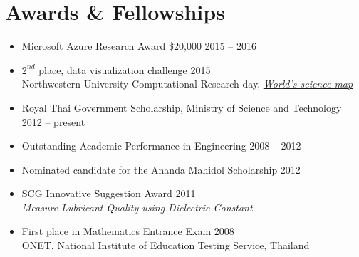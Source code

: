\section{\sc Awards \& Fellowships}

\begin{itemize}[leftmargin=0cm, label={}]
\itemsep0em

\item Microsoft Azure Research Award \$20,000 					\hfill 2015 -- 2016

\item $2^{nd}$ place, data visualization challenge					\hfill 2015\\
Northwestern University Computational Research day, {\em \href{http://map.scienceofscience.org}{World's science map}}

\item Royal Thai Government Scholarship, Ministry of Science and Technology \hfill 2012 -- present

\item Outstanding Academic Performance in Engineering			\hfill 2008 -- 2012

\item Nominated candidate for the Ananda Mahidol Scholarship 		\hfill 2012

\item SCG Innovative Suggestion Award							\hfill 2011\\
{\em Measure Lubricant Quality using Dielectric Constant}

\item First place in Mathematics Entrance Exam  					\hfill 2008\\
ONET, National Institute of Education Testing Service, Thailand

\end{itemize}
